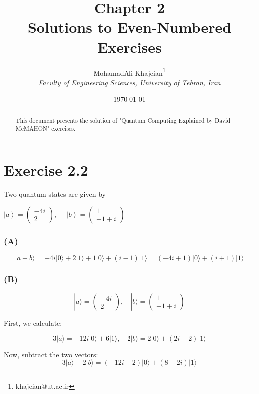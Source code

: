 \documentclass[12pt]{article}
\title{\textbf{Chapter 2} \\ \small Solutions to Even-Numbered Exercises}
\author{
    MohamadAli Khajeian\footnote{khajeian@ut.ac.ir} \\ 
    \small \textit{Faculty of Engineering Sciences, University of Tehran, Iran} \\ 
}
\date{\today}
\begin{document}
\maketitle

\begin{abstract}
    This document presents the solution of "Quantum Computing Explained by David McMAHON" exercises.
\end{abstract}

\section*{Exercise 2.2}
Two quantum states are given by

\begin{center}
    $\left| a \right\rangle = \begin{pmatrix} -4i \\ 2 \end{pmatrix}, \quad$
    $\left| b \right\rangle = \begin{pmatrix} 1 \\ -1 + i \end{pmatrix}$
\end{center}

\subsubsection*{(A)}

\[
|a + b\rangle = -4i|0\rangle + 2|1\rangle + 1|0\rangle + (i - 1)|1\rangle = (-4i+1)|0\rangle + (i+1)|1\rangle
\]

\subsubsection*{(B)}

\[
|a\rangle = \begin{pmatrix} -4i \\ 2 \end{pmatrix}, \quad |b\rangle = \begin{pmatrix} 1 \\ -1 + i \end{pmatrix}
\]

First, we calculate:

\[
3|a\rangle = -12i|0\rangle + 6|1\rangle , \quad 2|b\rangle = 2|0\rangle + (2i - 2)|1\rangle
\]

Now, subtract the two vectors:
\[
3|a\rangle - 2|b\rangle = (-12i - 2)|0\rangle + (8 - 2i)|1\rangle
\]
\end{document}
